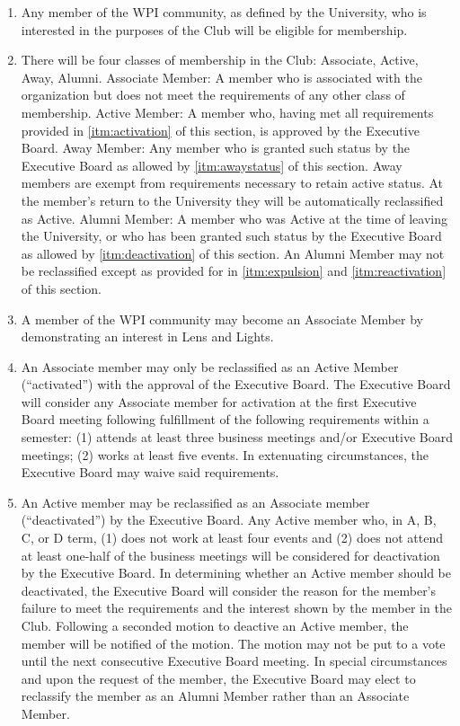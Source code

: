 \documentclass[12pt,letterpaper,oneside]{book}
\begin{document}
\begin{enumerate}

\item \label{itm:wpicommunity} Any member of the WPI community, as defined by the University, who is interested in the purposes of the Club will be eligible for membership.
\item \label{itm:classesofmembership} There will be four classes of membership in the Club: Associate, Active, Away, Alumni.
\subitem Associate Member: A member who is associated with the organization but does not meet the requirements of any other class of membership.
\subitem Active Member: A member who, having met all requirements provided in \cref{itm:activation} of this section, is approved by the Executive Board.
\subitem Away Member: Any member who is granted such status by the Executive Board as allowed by \cref{itm:awaystatus} of this section. Away members are exempt from requirements necessary to retain active status. At the member’s return to the University they will be automatically reclassified as Active.
\subitem Alumni Member: A member who was Active at the time of leaving the University, or who has been granted such status by the Executive Board as allowed by \cref{itm:deactivation} of this section. An Alumni Member may not be reclassified except as provided for in \cref{itm:expulsion} and \cref{itm:reactivation} of this section.
\item \label{itm:association} A member of the WPI community may become an Associate Member by demonstrating an interest in Lens and Lights.
\item \label{itm:activation} An Associate member may only be reclassified as an Active Member (“activated”) with the approval of the Executive Board. The Executive Board will consider any Associate member for activation at the first Executive Board meeting following fulfillment of the following requirements within a semester: (1) attends at least three business meetings and/or Executive Board meetings; (2) works at least five events. In extenuating circumstances, the Executive Board may waive said requirements.
\item \label{itm:deactivation} An Active member may be reclassified as an Associate member (“deactivated”) by the Executive Board. Any Active member who, in A, B, C, or D term, (1) does not work at least four events and (2) does not attend at least one-half of the business meetings will be considered for deactivation by the Executive Board. In determining whether an Active member should be deactivated, the Executive Board will consider the reason for the member’s failure to meet the requirements and the interest shown by the member in the Club. Following a seconded motion to deactive an Active member, the member will be notified of the motion. The motion may not be put to a vote until the next consecutive Executive Board meeting. In special circumstances and upon the request of the member, the Executive Board may elect to reclassify the member as an Alumni Member rather than an Associate Member.

\end{enumerate}
\end{document}
